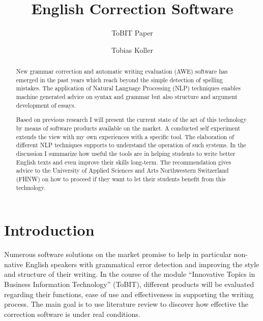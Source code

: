 \documentclass[runningheads]{llncs}
\let\OldTextregistered\textregistered
\renewcommand{\textregistered}{\OldTextregistered\xspace}
\begin{document}
\title{English Correction Software}
\subtitle{ToBIT Paper}

\author{Tobias Koller}



\maketitle              %


\begin{abstract}
New grammar correction and automatic writing evaluation (AWE) software has emerged in the past years which reach beyond the simple detection of spelling mistakes. The application of Natural Language Processing (NLP) techniques enables machine generated advice on syntax and grammar but also structure and argument development of essays. 

Based on previous research I will present the current state of the art of this technology by means of software products available on the market. A conducted self experiment extends the view with my own experiences with a specific tool. The elaboration of different NLP techniques supports to understand the operation of such systems. In the discussion I summarize how useful the tools are in helping students to write better English texts and even improve their skills long-term. The recommendation gives advice to the University of Applied Sciences and Arts Northwestern Switzerland (FHNW) on how to proceed if they want to let their students benefit from this technology.

\end{abstract}

\section{Introduction}
Numerous software solutions on the market promise to help in particular non-native English speakers with grammatical error detection and improving the style and structure of their writing. In the course of the module ``Innovative Topics in Business Information Technology'' (ToBIT), different products will be evaluated regarding their functions, ease of use and effectiveness in supporting the writing process. The main goal is to use literature review to discover how effective the correction software is under real conditions.
\end{document}

